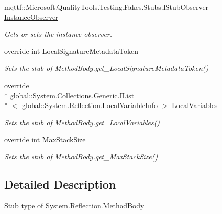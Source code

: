 \begin{DoxyCompactItemize}
mqttf\-::\-Microsoft.\-Quality\-Tools.\-Testing.\-Fakes.\-Stubs.\-I\-Stub\-Observer \hyperlink{class_system_1_1_reflection_1_1_fakes_1_1_stub_method_body_a4fb050cc65f417b21c8f6b2c694c490e}{Instance\-Observer}
\begin{DoxyCompactList}\small\item\em Gets or sets the instance observer.\end{DoxyCompactList}\item 
override int \hyperlink{class_system_1_1_reflection_1_1_fakes_1_1_stub_method_body_a3bac28b9ad8d16dce0862c0144159d92}{Local\-Signature\-Metadata\-Token}
\begin{DoxyCompactList}\small\item\em Sets the stub of Method\-Body.\-get\-\_\-\-Local\-Signature\-Metadata\-Token()\end{DoxyCompactList}\item 
override \\*
global\-::\-System.\-Collections.\-Generic.\-I\-List\\*
$<$ global\-::\-System.\-Reflection.\-Local\-Variable\-Info $>$ \hyperlink{class_system_1_1_reflection_1_1_fakes_1_1_stub_method_body_a9319b11d9381ed0329503301f2d1da96}{Local\-Variables}
\begin{DoxyCompactList}\small\item\em Sets the stub of Method\-Body.\-get\-\_\-\-Local\-Variables()\end{DoxyCompactList}\item 
override int \hyperlink{class_system_1_1_reflection_1_1_fakes_1_1_stub_method_body_ae3483636a3708860024b5e4ec5c8db38}{Max\-Stack\-Size}
\begin{DoxyCompactList}\small\item\em Sets the stub of Method\-Body.\-get\-\_\-\-Max\-Stack\-Size()\end{DoxyCompactList}\end{DoxyCompactItemize}


\subsection{Detailed Description}
Stub type of System.\-Reflection.\-Method\-Body



